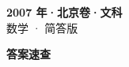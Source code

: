 \documentclass[zihao=-4, a4paper]{ctexart}
\begin{document}
\begin{center}
  {\Large\bfseries 2007 年·北京卷·文科}\\[4pt]
  {\large 数学 · 简答版}
\end{center}
\medskip
{}

\clearpage
{}
\begin{center}{\Large\bfseries 答案速查}\end{center}
\medskip

\end{document}
